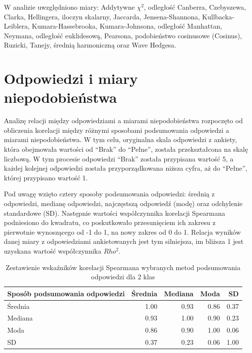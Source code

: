 \documentclass{amuthesis}
\begin{document}
W analizie uwzględniono miary: Addytywne \(\chi^2\), odległość Canberra,
Czebyszewa, Clarka, Hellingera, iloczyn skalarny, Jaccarda,
Jensena-Shannona, Kullbacka-Leiblera, Kumara-Hassebrooka,
Kumara-Johnsona, odległość Manhattan, Neymana, odległość euklidesową,
Pearsona, podobieństwo cosinusowe (Cosinus), Ruzicki, Tanejy, średnią
harmoniczną oraz Wave Hedgesa.

\hypertarget{odpowiedzi-i-miary-niepodobieux144stwa}{%
\section{Odpowiedzi i miary
niepodobieństwa}\label{odpowiedzi-i-miary-niepodobieux144stwa}}

Analizę relacji między odpowiedziami a miarami niepodobieństwa
rozpoczęto od obliczenia korelacji między różnymi sposobami podsumowania
odpowiedzi a miarami niepodobieństwa. W tym celu, oryginalna skala
odpowiedzi z ankiety, która obejmowała wartości od ``Brak'' do
``Pełne'', została przekształcona na skalę liczbową. W tym procesie
odpowiedzi ``Brak'' została przypisana wartość 5, a każdej kolejnej
odpowiedzi została przyporządkowana niższa cyfra, aż do ``Pełne'',
której przypisano wartość 1.

Pod uwagę wzięto cztery sposoby podsumowania odpowiedzi: średnią z
odpowiedzi, medianę odpowiedzi, najczęstszą odpowiedź (modę) oraz
odchylenie standardowe (SD). Następnie wartości współczynnika korelacji
Spearmana podniesiono do kwadratu, co poskutkowało przesunięciem ich
zakresu z pierwotnie wynoszącego od -1 do 1, na nowy zakres od 0 do 1.
Relacja wyników danej miary z odpowiedziami ankietowanych jest tym
silniejsza, im bliższa 1 jest uzyskana wartość współczynnika \(Rho^2\).

\hypertarget{tbl-mc2_cors}{}
\begin{table}
\caption{\label{tbl-mc2_cors}Zestawienie wskaźników korelacji Spearmana wybranych metod podsumowania
odpowiedzi dla 2 klas }\tabularnewline

\centering
\begin{tabular}{lrrrr}
\toprule
Sposób podsumowania
odpowiedzi & Średnia & Mediana & Moda & SD\\
\midrule
Średnia & 1.00 & 0.93 & 0.86 & 0.37\\
Mediana & 0.93 & 1.00 & 0.90 & 0.23\\
Moda & 0.86 & 0.90 & 1.00 & 0.06\\
SD & 0.37 & 0.23 & 0.06 & 1.00\\
\bottomrule
\end{tabular}
\end{table}
\end{document}
